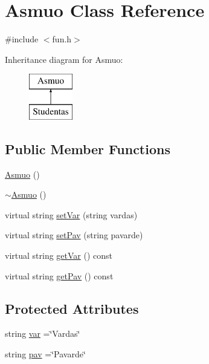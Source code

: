 \hypertarget{class_asmuo}{}\section{Asmuo Class Reference}
\label{class_asmuo}


{\ttfamily \#include $<$fun.\+h$>$}

Inheritance diagram for Asmuo\+:\begin{figure}[H]
\begin{center}
\leavevmode
\includegraphics[height=2.000000cm]{class_asmuo}
\end{center}
\end{figure}
\subsection*{Public Member Functions}
\begin{DoxyCompactItemize}
\item 
\mbox{\hyperlink{class_asmuo_a56b782374affc03749b66c66a6aa24f6}{Asmuo}} ()
\item 
\mbox{\hyperlink{class_asmuo_a999916e776cf2dcd963372ff914b5b16}{$\sim$\+Asmuo}} ()
\item 
virtual string \mbox{\hyperlink{class_asmuo_af4be3dfa7fff332ed2d79751a9f4d48b}{set\+Var}} (string vardas)
\item 
virtual string \mbox{\hyperlink{class_asmuo_a85b9da20a6a0231e590e3c080fa35411}{set\+Pav}} (string pavarde)
\item 
virtual string \mbox{\hyperlink{class_asmuo_a6d44b2f0683d418719691813482d7973}{get\+Var}} () const
\item 
virtual string \mbox{\hyperlink{class_asmuo_aa2710643b3fc638938a1955f797a2ba4}{get\+Pav}} () const
\end{DoxyCompactItemize}
\subsection*{Protected Attributes}
\begin{DoxyCompactItemize}
\item 
string \mbox{\hyperlink{class_asmuo_a8642c4f947a5b572f78b08669fd04fb0}{var}} =\char`\"{}Vardas\char`\"{}
\item 
string \mbox{\hyperlink{class_asmuo_a57565486ef558917d1cea576ccdfdad8}{pav}} =\char`\"{}Pavarde\char`\"{}
\end{DoxyCompactItemize}


